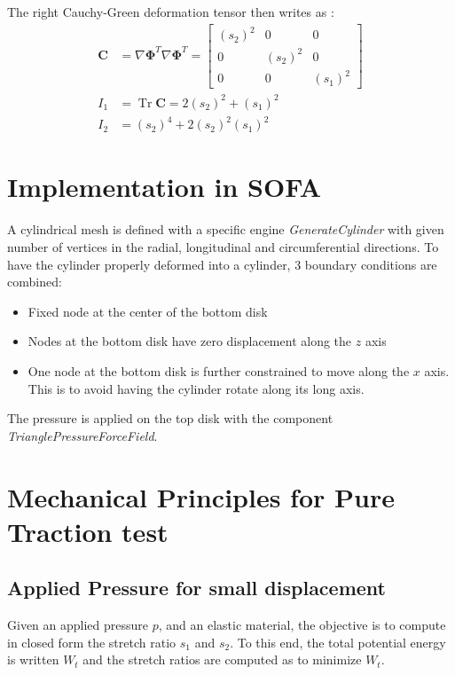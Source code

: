 \documentclass[a4paper,11pt]{article}
\newcommand{\deformation}{{\mathbf \Phi}}
\newcommand{\rcgd}{{\mathbf C}}
\DeclareMathOperator{\Trace}{Tr}
\begin{document}
The right Cauchy-Green deformation tensor then writes as :
\begin{align*}
\rcgd  &=\nabla \deformation^T \nabla \deformation^T=\left [ \begin{array}{ccc} (s_2)^2 & 0 & 0 \\0 & (s_2)^2 & 0 \\ 0 & 0 & (s_1)^2 \end{array} \right ] \\
I_1 &= \Trace\rcgd=   2 (s_2)^2+  (s_1)^2  \\
I_2 &=     (s_2)^4+ 2(s_2)^2 (s_1)^2 
\end{align*}
\section{Implementation in SOFA}

A cylindrical mesh is defined with a specific engine {\em GenerateCylinder} with given number of vertices in the radial, longitudinal and circumferential directions. To have the cylinder properly deformed into a cylinder, 3 boundary conditions are combined:

\begin{itemize}
	\item Fixed node at the center of the bottom disk
	\item Nodes at the bottom disk have zero displacement along the $z$ axis
	\item One node at the bottom disk is further constrained to move along the $x$ axis. This is to avoid having the cylinder rotate along its long axis.
\end{itemize}
 
The pressure is applied on the top disk with the component {\em TrianglePressureForceField}.

\section{Mechanical Principles for Pure Traction test}

\subsection{Applied Pressure for small displacement}

Given an applied pressure $p$, and an elastic material, the objective is to compute in closed form the stretch ratio $s_1$ and $s_2$.
To this end, the total potential energy is written $W_t$ and the stretch ratios are computed as to minimize $W_t$. 
\end{document}
